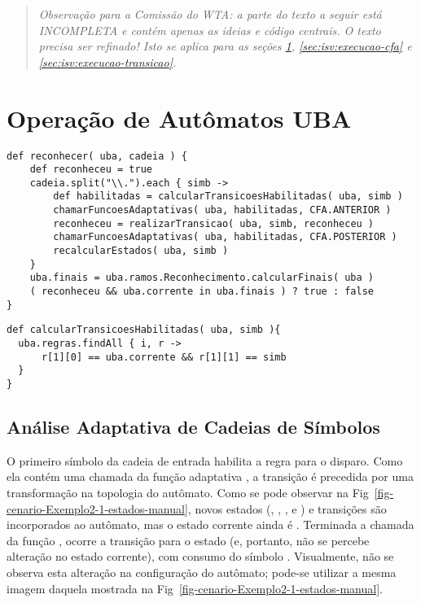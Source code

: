 
   \begin{quote}
   \textit{Observação para a Comissão do WTA: a parte do texto a seguir está INCOMPLETA e contém apenas as ideias e código centrais. O texto precisa ser refinado! Isto se aplica para as seções \ref{sec:isv:execucao-uba}, \ref{sec:isv:execucao-cfa} e \ref{sec:isv:execucao-transicao}.}
   \end{quote}

\section{Operação de Autômatos UBA}
\label{sec:isv:execucao-uba}



\begin{lstlisting}
def reconhecer( uba, cadeia ) {
    def reconheceu = true
    cadeia.split("\\.").each { simb ->
        def habilitadas = calcularTransicoesHabilitadas( uba, simb )
        chamarFuncoesAdaptativas( uba, habilitadas, CFA.ANTERIOR )
        reconheceu = realizarTransicao( uba, simb, reconheceu )
        chamarFuncoesAdaptativas( uba, habilitadas, CFA.POSTERIOR )
        recalcularEstados( uba, simb )
    }
    uba.finais = uba.ramos.Reconhecimento.calcularFinais( uba )
    ( reconheceu && uba.corrente in uba.finais ) ? true : false
}
\end{lstlisting}


\begin{lstlisting}
def calcularTransicoesHabilitadas( uba, simb ){
  uba.regras.findAll { i, r ->
      r[1][0] == uba.corrente && r[1][1] == simb
  }
}
\end{lstlisting}

\subsection*{Análise Adaptativa de Cadeias de Símbolos}


O primeiro símbolo  da cadeia de entrada habilita a regra  para o disparo. Como ela contém uma chamada da função adaptativa , a transição é precedida por uma transformação na topologia do autômato. Como se pode observar na Fig~\ref{fig-cenario-Exemplo2-1-estados-manual}, novos estados (, , ,  e ) e transições são incorporados ao autômato, mas o estado corrente ainda é . Terminada a chamada da função , ocorre a transição para o estado  (e, portanto, não se percebe alteração no estado corrente), com consumo do símbolo . Visualmente, não se observa esta alteração na configuração do autômato; pode-se utilizar a mesma imagem daquela mostrada na Fig~\ref{fig-cenario-Exemplo2-1-estados-manual}.

